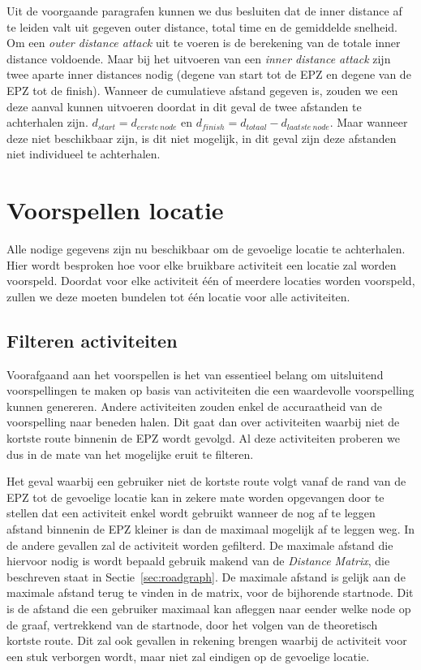 Uit de voorgaande paragrafen kunnen we dus besluiten dat de inner distance af
te leiden valt uit gegeven outer distance, total time en de gemiddelde
snelheid. Om een \textit{outer distance attack} uit te voeren is de berekening
van de totale inner distance voldoende. Maar bij het uitvoeren van een
\textit{inner distance attack} zijn twee aparte inner distances nodig (degene
van start tot de \ac{EPZ} en degene van de \ac{EPZ} tot de finish). Wanneer de
cumulatieve afstand gegeven is, zouden we een deze aanval kunnen uitvoeren
doordat in dit geval de twee afstanden te achterhalen zijn. $d_{start} =
    d_{eerste\ node}$ en $d_{finish} = d_{totaal} - d_{laatste\ node}$. Maar
wanneer deze niet beschikbaar zijn, is dit niet mogelijk, in dit geval zijn
deze afstanden niet individueel te achterhalen.

\section{Voorspellen locatie}
Alle nodige gegevens zijn nu beschikbaar om de gevoelige locatie te
achterhalen. Hier wordt besproken hoe voor elke bruikbare activiteit een
locatie zal worden voorspeld. Doordat voor elke activiteit één of meerdere
locaties worden voorspeld, zullen we deze moeten bundelen tot één locatie voor
alle activiteiten.

\subsection{Filteren activiteiten}
Voorafgaand aan het voorspellen is het van essentieel belang om uitsluitend
voorspellingen te maken op basis van activiteiten die een waardevolle
voorspelling kunnen genereren. Andere activiteiten zouden enkel de accuraatheid
van de voorspelling naar beneden halen. Dit gaat dan over activiteiten waarbij
niet de kortste route binnenin de \ac{EPZ} wordt gevolgd. Al deze activiteiten
proberen we dus in de mate van het mogelijke eruit te filteren.

Het geval waarbij een gebruiker niet de kortste route volgt vanaf de rand van
de \ac{EPZ} tot de gevoelige locatie kan in zekere mate worden opgevangen door
te stellen dat een activiteit enkel wordt gebruikt wanneer de nog af te leggen
afstand binnenin de \ac{EPZ} kleiner is dan de maximaal mogelijk af te leggen
weg. In de andere gevallen zal de activiteit worden gefilterd. De maximale
afstand die hiervoor nodig is wordt bepaald gebruik makend van de
\textit{Distance Matrix}, die beschreven staat in Sectie~\ref{sec:roadgraph}.
De maximale afstand is gelijk aan de maximale afstand terug te vinden in de
matrix, voor de bijhorende startnode. Dit is de afstand die een gebruiker
maximaal kan afleggen naar eender welke node op de graaf, vertrekkend van de
startnode, door het volgen van de theoretisch kortste route. Dit zal ook
gevallen in rekening brengen waarbij de activiteit voor een stuk verborgen
wordt, maar niet zal eindigen op de gevoelige locatie.

